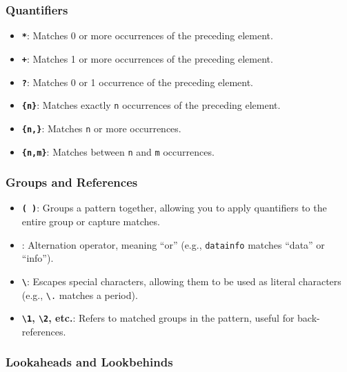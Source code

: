 \documentclass[
  letterpaper,
  DIV=11,
  numbers=noendperiod]{scrreprt}
\providecommand{\tightlist}{%
  \setlength{\itemsep}{0pt}\setlength{\parskip}{0pt}}\usepackage{longtable,booktabs,array}
\begin{document}
\hypertarget{quantifiers}{%
\subsubsection{Quantifiers}\label{quantifiers}}

\begin{itemize}
\tightlist
\item
  \textbf{\texttt{*}}: Matches 0 or more occurrences of the preceding
  element.
\item
  \textbf{\texttt{+}}: Matches 1 or more occurrences of the preceding
  element.
\item
  \textbf{\texttt{?}}: Matches 0 or 1 occurrence of the preceding
  element.
\item
  \textbf{\texttt{\{n\}}}: Matches exactly \texttt{n} occurrences of the
  preceding element.
\item
  \textbf{\texttt{\{n,\}}}: Matches \texttt{n} or more occurrences.
\item
  \textbf{\texttt{\{n,m\}}}: Matches between \texttt{n} and \texttt{m}
  occurrences.
\end{itemize}

\hypertarget{groups-and-references}{%
\subsubsection{Groups and References}\label{groups-and-references}}

\begin{itemize}
\tightlist
\item
  \textbf{\texttt{(\ )}}: Groups a pattern together, allowing you to
  apply quantifiers to the entire group or capture matches.
\item
  \textbf{\texttt{\textbar{}}}: Alternation operator, meaning ``or''
  (e.g., \texttt{data\textbar{}info} matches ``data'' or ``info'').
\item
  \textbf{\texttt{\textbackslash{}}}: Escapes special characters,
  allowing them to be used as literal characters (e.g.,
  \texttt{\textbackslash{}.} matches a period).
\item
  \textbf{\texttt{\textbackslash{}1}, \texttt{\textbackslash{}2}, etc.}:
  Refers to matched groups in the pattern, useful for back-references.
\end{itemize}

\hypertarget{lookaheads-and-lookbehinds}{%
\subsubsection{Lookaheads and
Lookbehinds}\label{lookaheads-and-lookbehinds}}
\end{document}
